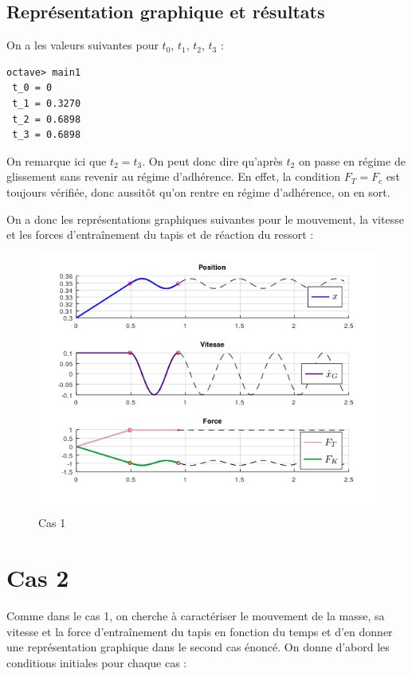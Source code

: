 \documentclass{article}
\newcommand{\ts}{\scriptscriptstyle}
\begin{document}
\subsection{Représentation graphique et résultats}
On a les valeurs suivantes pour $t_0$, $t_1$, $t_2$, $t_3$ :
\begin{lstlisting}
octave> main1
 t_0 = 0
 t_1 = 0.3270
 t_2 = 0.6898
 t_3 = 0.6898
\end{lstlisting}

On remarque ici que $t_2 = t_3$. On peut donc dire qu'après $t_2$ on passe en régime de glissement sans revenir au régime d'adhérence. En effet, la condition $F_{\ts{T}} = F_c$ est toujours vérifiée, donc aussitôt qu'on rentre en régime d'adhérence, on en sort.

On a donc les représentations graphiques suivantes pour le mouvement, la vitesse et les forces d'entraînement du tapis et de réaction du ressort : 

\begin{figure}[h!]
	\centering
	\includegraphics[scale=.6]{CAS1.png}
	\caption{Cas 1}
\end{figure}

\newpage

\section{Cas 2}
Comme dans le cas 1, on cherche à caractériser le mouvement de la masse, sa vitesse et la force d'entraînement du tapis en fonction du temps et d'en donner une représentation graphique dans le second cas énoncé. On donne d'abord les conditions initiales pour chaque cas :
\end{document}
